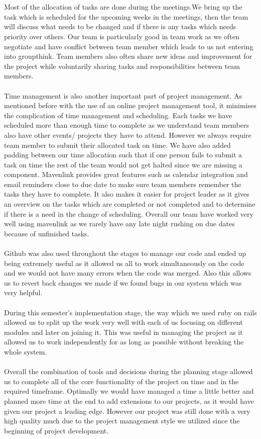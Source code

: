 \documentclass[a4paper]{article}
\begin{document}
\\\\
 Most of the allocation of tasks are done during the meetings.We bring up the task which is scheduled for the upcoming weeks in the meetings, then the team will discuss what needs to be changed and if there is any tasks which needs priority over others. Our team is particularly good in team work as we often negotiate and have conflict between team member which leads to us not entering into groupthink. Team members also often share new ideas and improvement for the project while voluntarily sharing tasks and responsibilities between team members.
\\\\
Time management is also another important part of project management. As mentioned before with the use of an online project management tool, it minimises the complication of time management and scheduling. Each tasks we have scheduled more than enough time to complete as we understand team members also have other events/ projects they have to attend. However we always require team member to submit their allocated task on time. We have also added padding between our time allocation such that if one person fails to submit a task on time the rest of the team would not get halted since we are missing a component. Mavenlink provides great features such as calendar integration and email reminders close to due date to make sure team members remember the tasks they have to complete. It also makes it easier for project leader as it gives an overview on the tasks which are completed or not completed and to determine if there is a need in the change of scheduling.  Overall our team have worked very well using mavenlink as we rarely have any late night rushing on due dates because of unfinished tasks.
 \\\\
Github was also used throughout the stages to manage our code and ended up being extremely useful as it allowed us all to work simultaneously on the code and we would not have many errors when the code was merged. Also this allows us to revert back changes we made if we found bugs in our system which was very helpful. 
\\\\
During this semester's implementation stage, the way which we used ruby on rails allowed us to split up the work very well with each of us focusing on different modules and later on joining it. This was useful in managing the project as it allowed us to work independently for as long as possible without breaking the whole system. 
\\\\
Overall the combination of tools and decisions during the planning stage allowed us to complete all of the core functionality of the project on time and in the required timeframe. Optimally we would have managed a time a little better and planned more time at the end to add extensions to our projects, as it would have given our project a leading edge. However our project was still done with a very high quality much due to the project management style we utilized since the beginning of project development.
\end{document}
